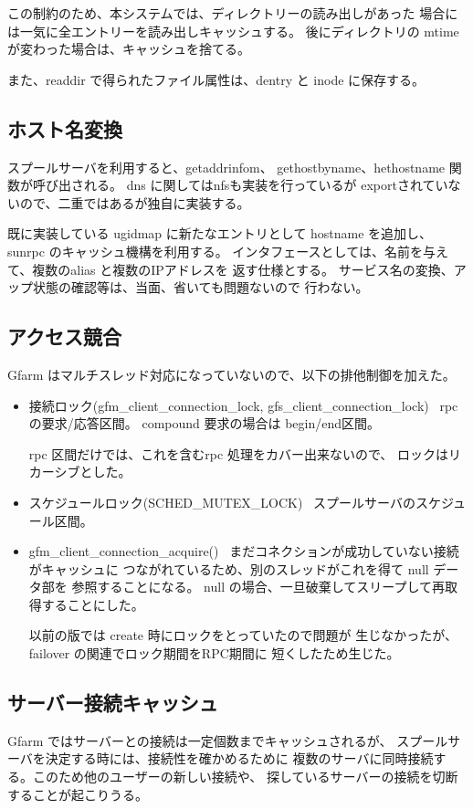 	この制約のため、本システムでは、ディレクトリーの読み出しがあった
	場合には一気に全エントリーを読み出しキャッシュする。
	後にディレクトリの mtime が変わった場合は、キャッシュを捨てる。

	また、readdir で得られたファイル属性は、dentry と inode に保存する。

\subsection{ホスト名変換}
	スプールサーバを利用すると、getaddrinfom、 gethostbyname、hethostname
	関数が呼び出される。 dns に関してはnfsも実装を行っているが
	exportされていないので、二重ではあるが独自に実装する。

	既に実装している ugidmap に新たなエントリとして hostname を追加し、
	sunrpc のキャッシュ機構を利用する。
	インタフェースとしては、名前を与えて、複数のalias と複数のIPアドレスを
	返す仕様とする。
	サービス名の変換、アップ状態の確認等は、当面、省いても問題ないので
	行わない。

\subsection{アクセス競合}

	Gfarm はマルチスレッド対応になっていないので、以下の排他制御を加えた。

	\begin{itemize}
	\item	接続ロック(gfm_client_connection_lock,
				gfs_client_connection_lock)	\
		rpcの要求/応答区間。 compound 要求の場合は begin/end区間。

		rpc 区間だけでは、これを含むrpc 処理をカバー出来ないので、
		ロックはリカーシブとした。
	\item	スケジュールロック(SCHED_MUTEX_LOCK)	\
		スプールサーバのスケジュール区間。
	\item	gfm_client_connection_acquire()	\
		まだコネクションが成功していない接続がキャッシュに
		つながれているため、別のスレッドがこれを得て null データ部を
		参照することになる。
		null の場合、一旦破棄してスリープして再取得することにした。

		以前の版では create 時にロックをとっていたので問題が
		生じなかったが、failover の関連でロック期間をRPC期間に
		短くしたため生じた。
	\end{itemize}


\subsection{サーバー接続キャッシュ}
	Gfarm ではサーバーとの接続は一定個数までキャッシュされるが、
	スプールサーバを決定する時には、接続性を確かめるために
	複数のサーバに同時接続する。このため他のユーザーの新しい接続や、
	探しているサーバーの接続を切断することが起こりうる。

